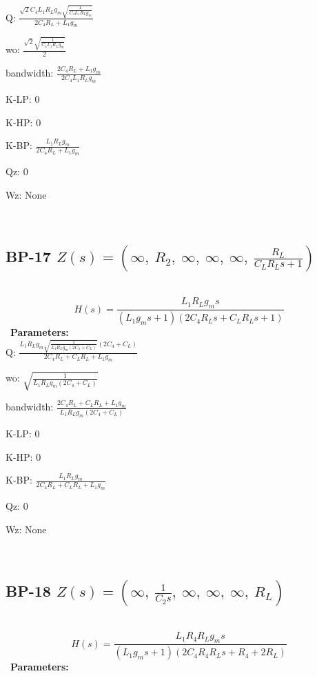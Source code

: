 \documentclass{article}
\begin{document}
Q: $\frac{\sqrt{2} C_{4} L_{1} R_{L} g_{m} \sqrt{\frac{1}{C_{4} L_{1} R_{L} g_{m}}}}{2 C_{4} R_{L} + L_{1} g_{m}}$\ 

wo: $\frac{\sqrt{2} \sqrt{\frac{1}{C_{4} L_{1} R_{L} g_{m}}}}{2}$\ 

bandwidth: $\frac{2 C_{4} R_{L} + L_{1} g_{m}}{2 C_{4} L_{1} R_{L} g_{m}}$\ 

K-LP: $0$\ 

K-HP: $0$\ 

K-BP: $\frac{L_{1} R_{L} g_{m}}{2 C_{4} R_{L} + L_{1} g_{m}}$\ 

Qz: $0$\ 

Wz: $\text{None}$\ 

\ 

\subsection{BP-17 $Z(s) = \left( \infty, \  R_{2}, \  \infty, \  \infty, \  \infty, \  \frac{R_{L}}{C_{L} R_{L} s + 1}\right)$ } \ 
\textbf{\[H(s) = \frac{L_{1} R_{L} g_{m} s}{\left(L_{1} g_{m} s + 1\right) \left(2 C_{4} R_{L} s + C_{L} R_{L} s + 1\right)}\] } \ 
\textbf{Parameters:}\\ 

Q: $\frac{L_{1} R_{L} g_{m} \sqrt{\frac{1}{L_{1} R_{L} g_{m} \left(2 C_{4} + C_{L}\right)}} \left(2 C_{4} + C_{L}\right)}{2 C_{4} R_{L} + C_{L} R_{L} + L_{1} g_{m}}$\ 

wo: $\sqrt{\frac{1}{L_{1} R_{L} g_{m} \left(2 C_{4} + C_{L}\right)}}$\ 

bandwidth: $\frac{2 C_{4} R_{L} + C_{L} R_{L} + L_{1} g_{m}}{L_{1} R_{L} g_{m} \left(2 C_{4} + C_{L}\right)}$\ 

K-LP: $0$\ 

K-HP: $0$\ 

K-BP: $\frac{L_{1} R_{L} g_{m}}{2 C_{4} R_{L} + C_{L} R_{L} + L_{1} g_{m}}$\ 

Qz: $0$\ 

Wz: $\text{None}$\ 

\ 

\subsection{BP-18 $Z(s) = \left( \infty, \  \frac{1}{C_{2} s}, \  \infty, \  \infty, \  \infty, \  R_{L}\right)$ } \ 
\textbf{\[H(s) = \frac{L_{1} R_{4} R_{L} g_{m} s}{\left(L_{1} g_{m} s + 1\right) \left(2 C_{4} R_{4} R_{L} s + R_{4} + 2 R_{L}\right)}\] } \ 
\textbf{Parameters:}\\ 
\end{document}
